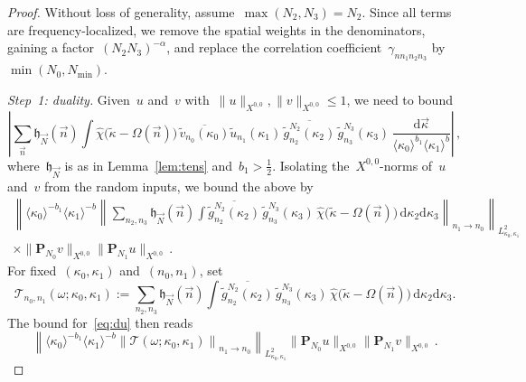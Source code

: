 \documentclass[11pt,reqno,english]{amsart}
\numberwithin{equation}{section}
\theoremstyle{plain}
\theoremstyle{definition}
\theoremstyle{remark}
\begin{document}
\begin{proof}
	Without loss of generality, assume~$\max(N_2,N_3)=N_2$.
	Since all terms are frequency-localized, we remove the spatial weights in the denominators, gaining a factor~$(N_{2}N_{3})^{-\alpha}$, and replace the correlation coefficient~$\gamma_{nn_{1}n_{2}n_{3}}$ by~$\min(N_{0},N_{\min})$.

	\emph{Step~1: duality.}
	Given~$u$ and~$v$ with~$\|u\|_{X^{0,0}}, \|v\|_{X^{0,0}}\le 1$, we need to bound
	\begin{equation}
		\label{eq:du}
		\left|
		\sum_{\vec{n}}
		\mathfrak{h}_{\vec{N}}(\vec n)
		\int
		\widehat{\chi}\big(\widetilde{\kappa}-\Omega(\vec n)\big)\,
		\overline{\widetilde{v}_{n_{0}}(\kappa_{0})}\widetilde{u}_{n_{1}}(\kappa_{1})\,
		\overline{\widetilde{g}_{n_{2}}^{N_{2}}(\kappa_{2})}\,
		\widetilde{g}_{n_{3}}^{N_{3}}(\kappa_{3})\,
		\frac{\mathrm{d}\vec \kappa}
		{\langle\kappa_{0}\rangle^{b_{1}}\langle\kappa_{1}\rangle^{b}}
		\right|\,,
	\end{equation}
	where~$\mathfrak{h}_{\vec{N}}$ is as in Lemma~\ref{lem:tens} and~$b_{1}>\frac{1}{2}$. Isolating the~$X^{0,0}$-norms of~$u$ and~$v$ from the random inputs, we bound the above by
	\begin{multline*}
		\left\|\langle\kappa_{0}\rangle^{-b_{1}}
		\langle\kappa_{1}\rangle^{-b}
		\left\|
		\sum_{n_{2},n_{3}}
		\mathfrak{h}_{\vec{N}}(\vec n)
		\int
		\overline{\widetilde{g}_{n_{2}}^{N_{2}}(\kappa_{2})}\,
		\widetilde{g}_{n_{3}}^{N_{3}}(\kappa_{3})\,
		\widehat{\chi}\big(\widetilde{\kappa}-\Omega(\vec n)\big)\,
		\mathrm{d}\kappa_{2}\mathrm{d}\kappa_{3}
		\right\|_{n_{1}\to n_{0}}
		\right\|_{L_{\kappa_{0},\kappa_{1}}^{2}}
		\\
		\times\|\mathbf{P}_{N_{0}}v\|_{X^{0,0}}
		\|\mathbf{P}_{N_{1}}u\|_{X^{0,0}}\,.
	\end{multline*}
	For fixed~$(\kappa_{0},\kappa_{1})$ and~$(n_{0},n_{1})$, set
	\[
	\mathcal{T}_{n_{0},n_{1}}(\omega;\kappa_{0},\kappa_{1})
	:=
	\sum_{n_{2},n_{3}}
	\mathfrak{h}_{\vec{N}}(\vec n)
	\int
	\overline{\widetilde{g}_{n_{2}}^{N_{2}}(\kappa_{2})}\,
	\widetilde{g}_{n_{3}}^{N_{3}}(\kappa_{3})\,
	\widehat{\chi}\big(\widetilde{\kappa}-\Omega(\vec n)\big)\,
	\mathrm{d}\kappa_{2}\mathrm{d}\kappa_{3}.
	\]
	The bound for~\eqref{eq:du} then reads
	\begin{equation}
		\label{ch}
		\left\|
		\langle\kappa_{0}\rangle^{-b_{1}}
		\langle\kappa_{1}\rangle^{-b}
		\left\|
		\mathcal{T}(\omega;\kappa_{0},\kappa_{1})
		\right\|_{n_{1}\to n_{0}}
		\right\|_{L_{\kappa_{0},\kappa_{1}}^{2}}
		\|\mathbf{P}_{N_{0}}u\|_{X^{0,0}}
		\|\mathbf{P}_{N_{1}}v\|_{X^{0,0}}\,.
	\end{equation}


\end{proof}
\end{document}
